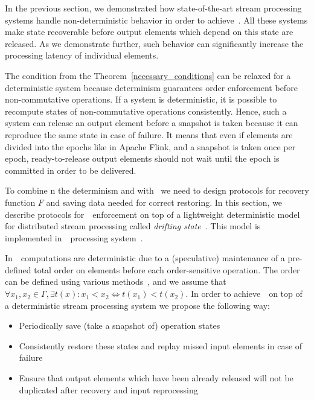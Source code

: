 
\label {fs-consistency-section}

In the previous section, we demonstrated how state-of-the-art stream processing systems handle non-deterministic behavior in order to achieve~\eo. All these systems make state recoverable before output elements which depend on this state are released. As we demonstrate further, such behavior can significantly increase the processing latency of individual elements.

The condition from the Theorem~\ref{necessary_conditions} can be relaxed for a deterministic system because determinism guarantees order enforcement before non-commutative operations. If a system is deterministic, it is possible to recompute states of non-commutative operations consistently. Hence, such a system can release an output element before a snapshot is taken because it can reproduce the same state in case of failure. It means that even if elements are divided into the epochs like in Apache Flink, and a snapshot is taken once per epoch, ready-to-release output elements should not wait until the epoch is committed in order to be delivered. 

To combine n the determinism and with \eo\ we need to design protocols for recovery function $F$ and saving data needed for correct restoring. In this section, we describe protocols for~\eo\ enforcement on top of a lightweight deterministic model for distributed stream processing called {\em drifting state}~\cite{we2018adbis}. This model is implemented in~\FlameStream\ processing system~\cite{we2018beyondmr}.

In~\FlameStream\, computations are deterministic due to a (speculative) maintenance of a pre-defined total order on elements before each order-sensitive operation. The order can be defined using various methods~\cite{we2018seim}, and we assume that $\forall x_1,x_2\in \Gamma, \exists t(x): x_1 < x_2 \Longleftrightarrow t(x_1) < t(x_2)$. In order to achieve~\eo\ on top of a deterministic stream processing system we propose the following way:
\begin{itemize}
    \item Periodically save (take a snapshot of) operation states
    \item Consistently restore these states and replay missed input elements in case of failure
    \item Ensure that output elements which have been already released will not be duplicated after recovery and input reprocessing
\end{itemize}

